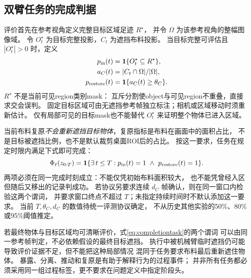\subsection{双臂任务的完成判据}
评价首先在参考视角定义完整目标区域足迹 $R^\star$，
并令 $\Omega$ 为该参考视角的整幅图像域。
令 $O_t^\star$ 为目标完整投影，$C_t$ 为遮挡布料投影。
当目标完整可评估且 $|O_t^\star|>0$ 时，定义
\begin{align}
 p_{\rm in}(t)&=\mathbf 1\{O_t^\star\subseteq R^\star\},\\
 a_C(t)&=|C_t\cap\Omega|/|\Omega|,\\
 p_{\rm restore}(t)&=\mathbf 1\{a_C(t)\ge\theta_C\}.
\end{align}
$R^\star$ 不是当前可见region类别mask：
互斥分割使object与可见region不重叠，直接求交会误判。
固定目标区域可由无遮挡参考帧独立标注；相机或区域移动时须重新估计。
仅有局部可见的目标mask也不能替代 $O_t^\star$ 来证明整个物体已进入区域。

当前布料复原\emph{不会重新遮挡目标物体}，复原指标是布料在画面中的面积占比，
不是目标被遮挡比例，也不是默认裁剪桌面ROI后的占比。
按这一要求，任务在规定时限内满足下式即可完成：
\begin{equation}
 \Phi_\ell(z_{0:T})=
 \mathbf 1\{\exists\,t\le T:
 p_{\rm in}(t)=1\ \land\ p_{\rm restore}(t)=1\}.
 \label{eq:completiontask}
\end{equation}
两项必须在同一完成时刻成立：不能仅凭初始布料面积较大，
也不能凭曾经入区但随后又移出的记录判成功。
若协议另要求连续 $d_C$ 帧确认，则在同一窗口内检验这两个谓词，
并要求窗口终点不超过 $T$；未指定持续时间时不默认添加这一要求。
当前 $T,\theta_C,d_C$ 的数值待统一评测协议确定，
不从历史其他实验的50\%、80\%或95\%阈值推定。

若最终物体与目标区域均可清晰评价，式\eqref{eq:completiontask}的两个谓词
可以由同一参考帧判定，不必依赖假设的最终目标遮挡。
执行中被机械臂临时遮挡仍可能导致评价证据不足，但不能把这种局部情况
混同于任务要求布料最后重新遮住物体。
暴露、分离、推动和复原是有助于解释行为的过程事件；
并非所有任务都必须采用同一组过程标签，更不要求在问题定义中指定阶段头。
